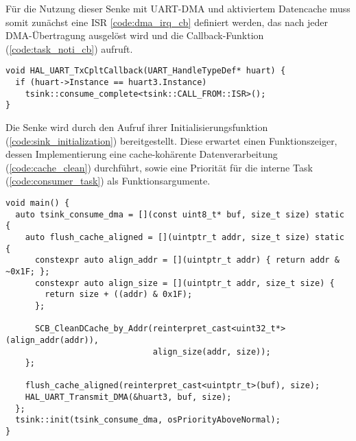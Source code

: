 Für die Nutzung dieser Senke mit UART-DMA und aktiviertem Datencache muss somit
zunächst eine ISR \ref{code:dma_irq_cb} definiert werden, das nach jeder
DMA-Übertragung ausgelöst wird und die Callback-Funktion
(\ref{code:task_noti_cb}) aufruft.

\begin{code}
\begin{verbatim}
void HAL_UART_TxCpltCallback(UART_HandleTypeDef* huart) {
  if (huart->Instance == huart3.Instance)
    tsink::consume_complete<tsink::CALL_FROM::ISR>();
}
\end{verbatim}
    \label{code:dma_irq_cb}
\end{code}

Die Senke wird durch den Aufruf ihrer Initialisierungsfunktion
(\ref{code:sink_initialization}) bereitgestellt. Diese erwartet einen
Funktionszeiger, dessen Implementierung eine cache-kohärente Datenverarbeitung
(\ref{code:cache_clean}) durchführt, sowie eine Priorität für die interne Task
(\ref{code:consumer_task}) als Funktionsargumente.

\begin{code}
\begin{verbatim}
void main() {
  auto tsink_consume_dma = [](const uint8_t* buf, size_t size) static {
    auto flush_cache_aligned = [](uintptr_t addr, size_t size) static {
      constexpr auto align_addr = [](uintptr_t addr) { return addr & ~0x1F; };
      constexpr auto align_size = [](uintptr_t addr, size_t size) {
        return size + ((addr) & 0x1F);
      };

      SCB_CleanDCache_by_Addr(reinterpret_cast<uint32_t*>(align_addr(addr)),
                              align_size(addr, size));
    };

    flush_cache_aligned(reinterpret_cast<uintptr_t>(buf), size);
    HAL_UART_Transmit_DMA(&huart3, buf, size);
  };
  tsink::init(tsink_consume_dma, osPriorityAboveNormal);
}
\end{verbatim}
    \label{code:sink_initialization}
\end{code}

